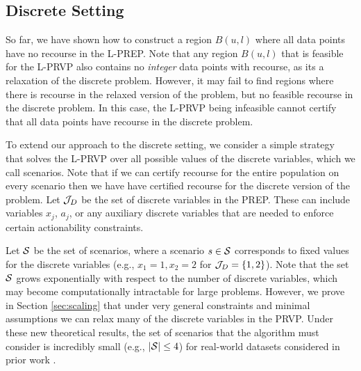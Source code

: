 \subsection{Discrete Setting}

So far, we have shown how to construct a region $B(u,l)$ where all data points have no recourse in the L-PREP. Note that any region $B(u,l)$ that is feasible for the L-PRVP also contains no \textit{integer} data points with recourse, as its a relaxation of the discrete problem. However, it may fail to find regions where there is recourse in the relaxed version of the problem, but no feasible recourse in the discrete problem. In this case, the L-PRVP being infeasible cannot certify that all data points have recourse in the discrete problem.

To extend our approach to the discrete setting, we consider a simple strategy that solves the L-PRVP over all possible values of the discrete variables, which we call scenarios. Note that if we can certify recourse for the entire population on every scenario then we have have certified recourse for the discrete version of the problem. Let ${\cal J}_D$ be the set of discrete variables in the PREP. These can include variables $x_j$, $a_j$, or any auxiliary discrete variables that are needed to enforce certain actionability constraints. 

Let ${\cal S}$ be the set of scenarios, where a scenario $s \in {\cal S}$ corresponds to fixed values for the discrete variables (e.g., $x_1 = 1, x_2 = 2$ for ${\cal J}_D = \{1,2\}$). Note that the set ${\cal S}$ grows exponentially with respect to the number of discrete variables, which may become computationally intractable for large problems. However, we prove in Section \ref{sec:scaling} that under very general constraints and minimal assumptions we can relax many of the discrete variables in the PRVP. Under these new theoretical results, the set of scenarios that the algorithm must consider is incredibly small (e.g., $|{\cal S}| \leq 4$) for real-world datasets considered in prior work \cite{kothari2023prediction}. 

